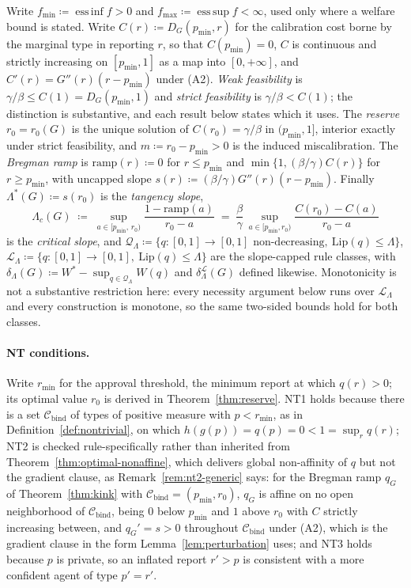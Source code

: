 \documentclass[acmsmall,nonacm,screen]{acmart}
\theoremstyle{acmplain}%
\theoremstyle{acmdefinition}%
\newcommand{\Cbind}{\mathcal{C}_{\mathrm{bind}}}
\numberwithin{equation}{section}
\begin{document}
Write $f_{\min} \coloneqq \operatorname{ess\,inf} f > 0$ and $f_{\max} \coloneqq \operatorname{ess\,sup} f < \infty$, used only where a welfare bound is stated. Write $C(r) \coloneqq D_G(p_{\min},r)$ for the calibration cost borne by the marginal type in reporting $r$, so that $C(p_{\min}) = 0$, $C$ is continuous and strictly increasing on $[p_{\min},1]$ as a map into $[0,+\infty]$, and $C'(r) = G''(r)(r - p_{\min})$ under (A2). \emph{Weak feasibility} is $\gamma/\beta \le C(1) = D_G(p_{\min},1)$ and \emph{strict feasibility} is $\gamma/\beta < C(1)$; the distinction is substantive, and each result below states which it uses. The \emph{reserve} $r_0 = r_0(G)$ is the unique solution of $C(r_0) = \gamma/\beta$ in $(p_{\min},1]$, interior exactly under strict feasibility, and $m \coloneqq r_0 - p_{\min} > 0$ is the induced miscalibration. The \emph{Bregman ramp} is $\mathrm{ramp}(r) \coloneqq 0$ for $r \le p_{\min}$ and $\min\{1, (\beta/\gamma)C(r)\}$ for $r \ge p_{\min}$, with uncapped slope $s(r) \coloneqq (\beta/\gamma) G''(r)(r - p_{\min})$. Finally $\Lambda^*(G) \coloneqq s(r_0)$ is the \emph{tangency slope},
\begin{equation}\label{eq:critical-slope-def}
\Lambda_c(G) \;\coloneqq\; \sup_{a \in [p_{\min},\,r_0)} \frac{1 - \mathrm{ramp}(a)}{r_0 - a} \;=\; \frac{\beta}{\gamma}\, \sup_{a \in [p_{\min},r_0)} \frac{C(r_0) - C(a)}{r_0 - a}
\end{equation}
is the \emph{critical slope}, and $\mathcal Q_\Lambda \coloneqq \{q : [0,1] \to [0,1] \text{ non-decreasing},\ \mathrm{Lip}(q) \le \Lambda\}$, $\mathcal L_\Lambda \coloneqq \{q : [0,1] \to [0,1],\ \mathrm{Lip}(q) \le \Lambda\}$ are the slope-capped rule classes, with $\delta_\Lambda(G) \coloneqq W^* - \sup_{q \in \mathcal Q_\Lambda} W(q)$ and $\delta^{\mathcal L}_\Lambda(G)$ defined likewise. Monotonicity is not a substantive restriction here: every necessity argument below runs over $\mathcal L_\Lambda$ and every construction is monotone, so the same two-sided bounds hold for both classes.

\paragraph{NT conditions.}
Write $r_{\min}$ for the approval threshold, the minimum report at which $q(r) > 0$; its optimal value $r_0$ is derived in Theorem~\ref{thm:reserve}. NT1 holds because there is a set $\Cbind$ of types of positive measure with $p < r_{\min}$, as in Definition~\ref{def:nontrivial}, on which $h(g(p)) = q(p) = 0 < 1 = \sup_r q(r)$; NT2 is checked rule-specifically rather than inherited from Theorem~\ref{thm:optimal-nonaffine}, which delivers global non-affinity of $q$ but not the gradient clause, as Remark~\ref{rem:nt2-generic} says: for the Bregman ramp $q_G$ of Theorem~\ref{thm:kink} with $\Cbind = (p_{\min},r_0)$, $q_G$ is affine on no open neighborhood of $\Cbind$, being $0$ below $p_{\min}$ and $1$ above $r_0$ with $C$ strictly increasing between, and $q_G' = s > 0$ throughout $\Cbind$ under (A2), which is the gradient clause in the form Lemma~\ref{lem:perturbation} uses; and NT3 holds because $p$ is private, so an inflated report $r' > p$ is consistent with a more confident agent of type $p' = r'$.
\end{document}
